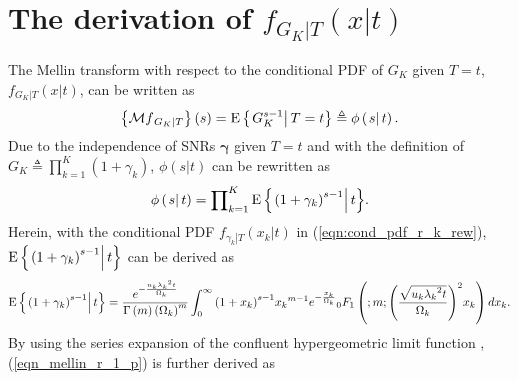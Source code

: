 \documentclass[12pt,onecolumn,draftcls]{IEEEtran}
\newcommand{\bs}{\boldsymbol}
\begin{document}
\section{The derivation of ${f_{\left. G_K \right|T}}(x|t)$}\label{app:phi_derivation}
The Mellin transform with respect to the conditional PDF of $G_K$ given $T=t$, ${f_{\left. G_K \right|T}}(x|t)$, can be written as
\begin{equation}\label{eqn_mellin_Rk1_def}
\left\{ {\mathcal M{f_{\left. G_K \right|T}}} \right\}\left( s \right) = {\rm E}\left\{ {\left. {{G_K^{s - 1}}} \right|T=t} \right\} \triangleq \phi \left( {\left. s \right|t} \right).
\end{equation}
Due to the independence of SNRs $\bs \gamma $ given $T=t$ and with the definition of $G_K \triangleq \prod\nolimits_{k = 1}^K {\left( {1 + {\gamma _k}} \right)}$, $\phi \left( {\left. s \right|t} \right)$ can be rewritten as
\begin{equation}\label{eqn_mellin_Rk}
\phi \left( {\left. s \right|t} \right) = \prod\nolimits_{k = 1}^K {{\rm E}\left\{ {\left. {{{{{\left(1 + \gamma_k\right)}} }^{s - 1}}} \right|t} \right\}}.
\end{equation}
Herein, with the conditional PDF ${{f_{\left. {{\gamma _k}} \right|T}}\left( {\left. {{x_k}} \right|t} \right)}$ in (\ref{eqn:cond_pdf_r_k_rew}), ${\rm E}\left\{ {\left. {{{\left( {1 + {\gamma_k}} \right)}^{s - 1}}} \right|t} \right\}$ can be derived as
\begin{equation}\label{eqn_mellin_r_1_p}
{\rm{E}}\left\{ {\left. {{{\left( {1 + {\gamma_k}} \right)}^{s - 1}}} \right|t} \right\} %
= \frac{{{e^{ - \frac{{{u_k}{\lambda _k}^2t}}{{{\Omega _k}}}}}}}{{\Gamma \left( m \right){{\left( {{\Omega _k}} \right)}^m}}}\int\nolimits_0^\infty  {{{\left( {1 + {x_k}} \right)}^{s - 1}}{x_k}^{m - 1}{e^{ - \frac{{{x_k}}}{{{\Omega _k}}}}}{}_0{F_1}\left( {;m;{{\left( {\frac{{\sqrt {{u_k}{\lambda _k}^2t} }}{{{\Omega _k}}}} \right)}^2}{x_k}} \right)d{x_k}}.
\end{equation}
By using the series expansion of the confluent hypergeometric limit function \cite[Eq.16.2.1]{olver2010nist}, (\ref{eqn_mellin_r_1_p}) is further derived as
\end{document}
